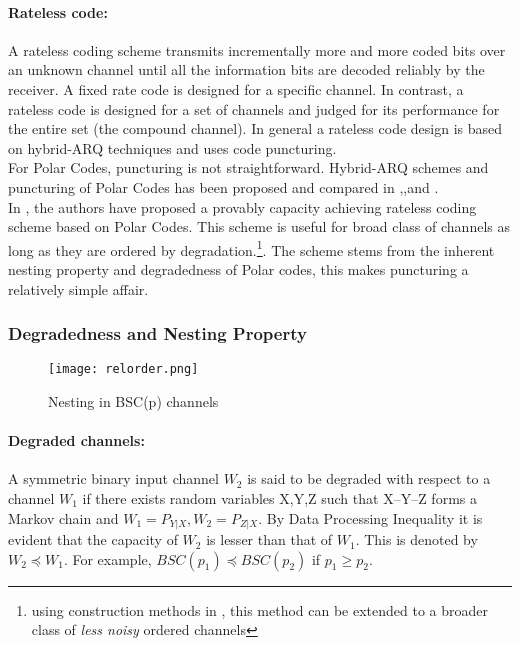 \documentclass[
11pt, %
a4paper, %
oneside, %
headinclude,footinclude, %
BCOR5mm, %
]{scrartcl}
\begin{document}
\paragraph{Rateless code:}A rateless coding scheme transmits incrementally more and more coded bits over an unknown channel until all the information bits are decoded reliably by the receiver. A fixed rate code is designed for a specific channel. In contrast, a rateless code is designed for a set of channels and judged for its performance for the entire set (the compound channel). In general a rateless code design is based on hybrid-ARQ techniques and uses code puncturing. \\For Polar Codes, puncturing is not straightforward. Hybrid-ARQ schemes and puncturing of Polar Codes has been proposed and compared in \cite{harqtav},\cite{harqcheng},and \cite{harqchen}.\\ In \cite{chen}, the authors have proposed a provably capacity achieving rateless coding scheme based on Polar Codes. This scheme is useful for broad class of channels as long as they are ordered by degradation.\footnote{using construction methods in \cite{wang},\cite{mondelli} this method can be extended to a broader class of \emph{less noisy} ordered channels}. The scheme stems from the inherent nesting property and degradedness of Polar codes, this makes puncturing a relatively simple affair. 

\subsubsection{Degradedness and Nesting Property}
\begin{wrapfigure}{r}{0.5\textwidth}
  \begin{center}
    \texttt{[image: relorder.png]}
  \end{center}
  \caption{Nesting in BSC(p) channels}
  \label{fig:relorder}
\end{wrapfigure}
\paragraph{Degraded channels:}A symmetric binary input channel $W_2$ is said to be degraded with respect to a channel $W_1$ if there exists random variables X,Y,Z such that X\---Y\---Z forms a Markov chain and $W_1=P_{Y|X} , W_2=P_{Z|X}$. By Data Processing Inequality it is evident that the capacity of $W_2$ is lesser than that of $W_1$. This is denoted by $W_2 \preceq W_1$. For example, $BSC(p_1) \preceq BSC(p_2)$ if $p_1 \geq p_2$.
\end{document}
